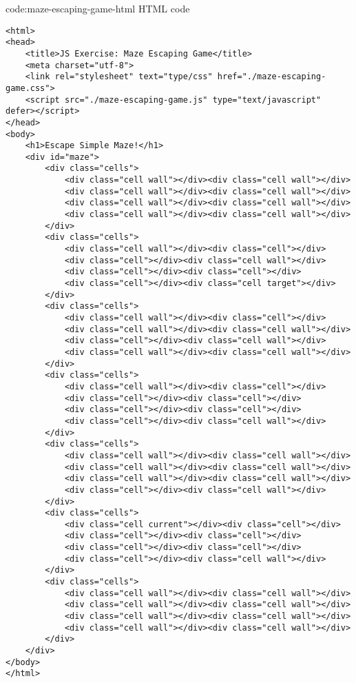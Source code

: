 \begin{codeenv}{code:maze-escaping-game-html}{ HTML code}
\begin{verbatim}
<html>
<head>
    <title>JS Exercise: Maze Escaping Game</title>
    <meta charset="utf-8">
    <link rel="stylesheet" text="type/css" href="./maze-escaping-game.css">
    <script src="./maze-escaping-game.js" type="text/javascript" defer></script>
</head>
<body>
    <h1>Escape Simple Maze!</h1>
    <div id="maze">
        <div class="cells">
            <div class="cell wall"></div><div class="cell wall"></div>
            <div class="cell wall"></div><div class="cell wall"></div>
            <div class="cell wall"></div><div class="cell wall"></div>
            <div class="cell wall"></div><div class="cell wall"></div>
        </div>
        <div class="cells">
            <div class="cell wall"></div><div class="cell"></div>
            <div class="cell"></div><div class="cell wall"></div>
            <div class="cell"></div><div class="cell"></div>
            <div class="cell"></div><div class="cell target"></div>
        </div>
        <div class="cells">
            <div class="cell wall"></div><div class="cell"></div>
            <div class="cell wall"></div><div class="cell wall"></div>
            <div class="cell"></div><div class="cell wall"></div>
            <div class="cell wall"></div><div class="cell wall"></div>
        </div>
        <div class="cells">
            <div class="cell wall"></div><div class="cell"></div>
            <div class="cell"></div><div class="cell"></div>
            <div class="cell"></div><div class="cell"></div>
            <div class="cell"></div><div class="cell wall"></div>
        </div>
        <div class="cells">
            <div class="cell wall"></div><div class="cell wall"></div>
            <div class="cell wall"></div><div class="cell wall"></div>
            <div class="cell wall"></div><div class="cell wall"></div>
            <div class="cell"></div><div class="cell wall"></div>
        </div>
        <div class="cells">
            <div class="cell current"></div><div class="cell"></div>
            <div class="cell"></div><div class="cell"></div>
            <div class="cell"></div><div class="cell"></div>
            <div class="cell"></div><div class="cell wall"></div>
        </div>
        <div class="cells">
            <div class="cell wall"></div><div class="cell wall"></div>
            <div class="cell wall"></div><div class="cell wall"></div>
            <div class="cell wall"></div><div class="cell wall"></div>
            <div class="cell wall"></div><div class="cell wall"></div>
        </div>
    </div>
</body>
</html>
\end{verbatim}
\end{codeenv}
